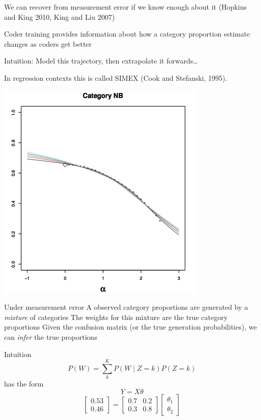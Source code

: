 \documentclass{mediumfoils}
\begin{document}

We can recover from measurement error if we know enough about it (Hopkins and King 2010, King and Liu 2007)

Coder training provides information about how a category proportion estimate changes as coders get better

Intuition: 
\ita
\itm Model this trajectory, then extrapolate it forwards\ldots
\itz

In regression contexts this is called SIMEX (Cook and Stefanski, 1995).


\centerline{\includegraphics[scale=.8]{pictures/simex-proportion-hopkins-king}}


Under measurement error
\ita
\itm A observed category proportions are generated by a \textit{mixture} of categories
\itm The weights for this mixture are the true category proportions
\itz
Given the confusion matrix (or the true generation probabilities), we can \textit{infer} the true proportions


Intuition
\[
{P(W)} = \sum^K_k {P(W \mid Z=k)} P(Z=k)
\]
has the form
\[
Y = X\theta
\]
\[
\left[\begin{array}{c}0.53 \\0.46\end{array}\right] = 
\left[\begin{array}{cc}0.7 & 0.2 \\0.3 & 0.8\end{array}\right] \left[\begin{array}{c}\theta_1 \\\theta_2\end{array}\right]
\]
\end{document}

